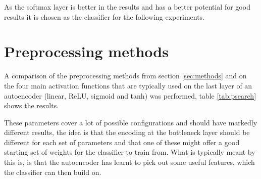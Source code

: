       As the softmax layer is better in the results and has a better potential for good results
      it is chosen as the classifier for the following experiments.

      \section{Preprocessing methods} \label{sec:psearch}

          A comparison of the preprocessing methods from section
          \ref{sec:methods} and on the four main activation functions
          that are typically used on the last layer of an autoencoder
          (linear, ReLU, sigmoid and tanh) was performed,
          table \ref{tab:psearch} shows the results.

          These parameters cover a lot of possible
          configurations and should have markedly different results, the idea
          is that the encoding at the bottleneck layer should be different for
          each set of parameters and that
          one of these might offer a good starting set of weights for the
          classifier to train from. What is typically meant by this is, is that
          the autoencoder has learnt to pick out some useful features, which the classifier
          can then build on.

